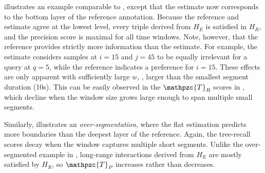 \documentclass{article}
\def\shag{\ensuremath{\mathpzc{T}}}
\begin{document}
 illustrates an example comparable to , except that the
estimate now corresponds to the bottom layer of the reference annotation.
Because the reference and estimate agree at the lowest level, every triple derived from
$H_E$ is satisfied in $H_R$, and the precision score is maximal for all time windows.
Note, however, that the reference provides strictly more information than the estimate.  For example, the estimate considers samples at $i=15$ and $j=45$ to be equally irrelevant for a 
query at $q=5$, while the reference indicates a preference for $i=15$.
These effects are only apparent with sufficiently large $w$, \ie, larger than the
smallest segment duration (10s).  This can be easily observed in the $\shag_R$
scores in , which decline when the window size grows
large enough to span multiple small segments.

Similarly,  illustrates an \emph{over-segmentation}, where the
flat estimation
predicts more boundaries than the deepest layer of the reference.  Again, the tree-recall
scores decay when the window captures multiple short segments.
Unlike the over-segmented example in , long-range interactions derived from $H_E$ are mostly satisfied by $H_R$, so $\shag_P$ increases
rather than decreases.
\end{document}
